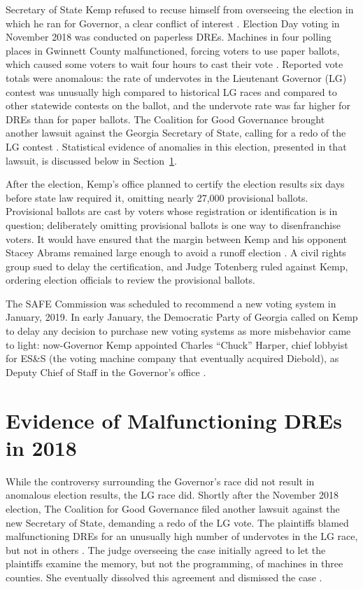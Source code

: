 \documentclass[runningheads]{llncs}
\begin{document}
Secretary of State Kemp refused to recuse himself from overseeing the election in which he ran for Governor, 
a clear conflict of interest \cite{williams_georgia_2018}.
Election Day voting in November 2018 was conducted on paperless DREs.
Machines in four polling places in Gwinnett County malfunctioned, forcing
voters to use paper ballots, which caused some voters to wait four hours to cast their vote \cite{lockhart_voting_2018}.
Reported vote totals were anomalous: 
the rate of undervotes in the Lieutenant Governor (LG) contest was unusually high
compared to historical LG races and compared to other
statewide contests on the ballot, and the undervote rate was far higher for DREs than for
paper ballots.
The Coalition for Good Governance brought another lawsuit against the Georgia
Secretary of State, calling for a redo of the LG contest \cite{coalition_crittenden_2019}.
Statistical evidence of anomalies in this election, presented in that lawsuit, is discussed 
below in Section~\ref{sec:ga_stats}.

After the election, Kemp's office planned to certify the election results six days before state law required it,
omitting nearly 27,000 provisional ballots.
Provisional ballots are cast by voters whose registration or identification is in question;
deliberately omitting provisional ballots is one way to disenfranchise voters.
It would have ensured that the margin between Kemp and his opponent Stacey Abrams remained 
large enough to avoid a runoff election \cite{blinder_federal_2018}.
A civil rights group sued to delay the certification, and
Judge Totenberg ruled against Kemp,
ordering election officials to review the provisional ballots.

The SAFE Commission was scheduled to recommend a new voting system in January, 2019.
In early January, the Democratic Party of Georgia called on Kemp to delay any decision to purchase
new voting systems as more misbehavior came to light:
now-Governor Kemp appointed Charles ``Chuck'' Harper, chief lobbyist for ES\&S (the voting machine
company that eventually acquired Diebold), as Deputy Chief of Staff in the Governor's office \cite{noauthor_SAFE_2019}.

 
\section{Evidence of Malfunctioning DREs in 2018}\label{sec:ga_stats}

While the controversy surrounding the Governor's race did
not result in anomalous election results,
the LG race did.
Shortly after the November 2018 election, The Coalition for Good Governance  filed another lawsuit 
against the new Secretary of State, demanding a redo of the LG vote.
The plaintiffs blamed malfunctioning DREs for an unusually high number of undervotes in the LG race, but not in others \cite{coalition_crittenden_2019}.
The judge overseeing the case initially agreed to let the plaintiffs examine the memory, but not the programming, of machines in three counties.
She eventually dissolved this agreement and dismissed the case \cite{zetter_georgia_2019}.
\end{document}
